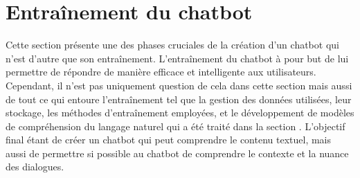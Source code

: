 \documentclass{rapport}
\begin{document}
\newpage
\section{Entraînement du chatbot}
Cette section présente une des phases cruciales de la création d'un chatbot qui n'est d'autre que son entraînement. L'entraînement du chatbot à pour but de lui permettre de répondre de manière efficace et intelligente aux utilisateurs. Cependant, il n'est pas uniquement question de cela dans cette section mais aussi de tout ce qui entoure l'entraînement tel que la gestion des données utilisées, leur stockage, les méthodes d'entraînement employées, et le développement de modèles de compréhension du langage naturel qui a été traité dans la section . L'objectif final étant de créer un chatbot qui peut comprendre le contenu textuel, mais aussi de permettre si possible au chatbot de comprendre le contexte et la nuance des dialogues. 
\end{document}
